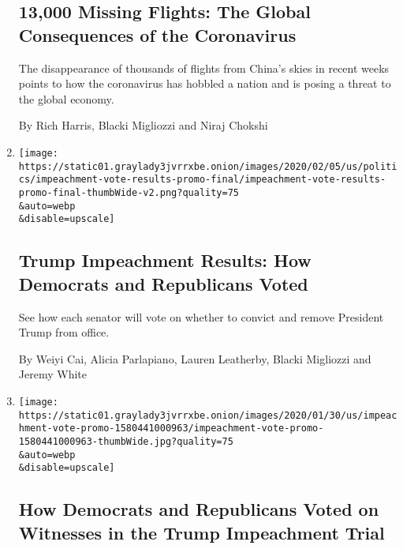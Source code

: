 \begin{enumerate}
  \hypertarget{13000-missing-flights-the-global-consequences-of-the-coronavirus}{%
  \subsection{13,000 Missing Flights: The Global Consequences of the
  Coronavirus}\label{13000-missing-flights-the-global-consequences-of-the-coronavirus}}

  The disappearance of thousands of flights from China's skies in recent
  weeks points to how the coronavirus has hobbled a nation and is posing
  a threat to the global economy.

  By Rich Harris, Blacki Migliozzi and Niraj Chokshi
\item
  \href{/interactive/2020/02/05/us/politics/impeachment-vote-results.html}{}

  \texttt{[image: https://static01.graylady3jvrrxbe.onion/images/2020/02/05/us/politics/impeachment-vote-results-promo-final/impeachment-vote-results-promo-final-thumbWide-v2.png?quality=75\\\&auto=webp\\\&disable=upscale]}

  \hypertarget{trump-impeachment-results-how-democrats-and-republicans-voted}{%
  \subsection{Trump Impeachment Results: How Democrats and Republicans
  Voted}\label{trump-impeachment-results-how-democrats-and-republicans-voted}}

  See how each senator will vote on whether to convict and remove
  President Trump from office.

  By Weiyi Cai, Alicia Parlapiano, Lauren Leatherby, Blacki Migliozzi
  and Jeremy White
\item
  \href{/interactive/2020/01/31/us/politics/impeachment-vote.html}{}

  \texttt{[image: https://static01.graylady3jvrrxbe.onion/images/2020/01/30/us/impeachment-vote-promo-1580441000963/impeachment-vote-promo-1580441000963-thumbWide.jpg?quality=75\\\&auto=webp\\\&disable=upscale]}

  \hypertarget{how-democrats-and-republicans-voted-on-witnesses-in-the-trump-impeachment-trial}{%
  \subsection{How Democrats and Republicans Voted on Witnesses in the
  Trump Impeachment
  Trial}\label{how-democrats-and-republicans-voted-on-witnesses-in-the-trump-impeachment-trial}}


\end{enumerate}

